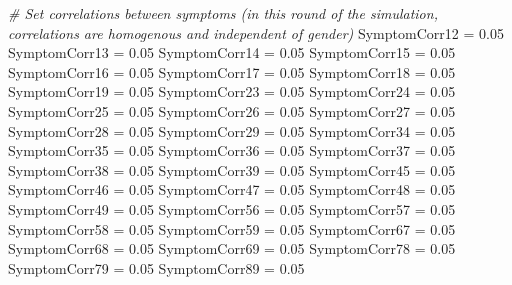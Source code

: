 \documentclass[]{article}
\newenvironment{Shaded}{\begin{snugshade}}{\end{snugshade}}
\newcommand{\FloatTok}[1]{\textcolor[rgb]{0.00,0.00,0.81}{#1}}
\newcommand{\StringTok}[1]{\textcolor[rgb]{0.31,0.60,0.02}{#1}}
\newcommand{\CommentTok}[1]{\textcolor[rgb]{0.56,0.35,0.01}{\textit{#1}}}
\newcommand{\NormalTok}[1]{#1}
\begin{document}
\begin{Shaded}
\begin{Highlighting}[]
{{{{{{{{{{\CommentTok{# Set correlations between symptoms (in this round of the simulation, correlations are homogenous and independent of gender)}
\NormalTok{SymptomCorr12 =}\StringTok{ }\FloatTok{0.05}
\NormalTok{SymptomCorr13 =}\StringTok{ }\FloatTok{0.05}
\NormalTok{SymptomCorr14 =}\StringTok{ }\FloatTok{0.05}
\NormalTok{SymptomCorr15 =}\StringTok{ }\FloatTok{0.05}
\NormalTok{SymptomCorr16 =}\StringTok{ }\FloatTok{0.05}
\NormalTok{SymptomCorr17 =}\StringTok{ }\FloatTok{0.05}
\NormalTok{SymptomCorr18 =}\StringTok{ }\FloatTok{0.05}
\NormalTok{SymptomCorr19 =}\StringTok{ }\FloatTok{0.05}
\NormalTok{SymptomCorr23 =}\StringTok{ }\FloatTok{0.05}
\NormalTok{SymptomCorr24 =}\StringTok{ }\FloatTok{0.05}
\NormalTok{SymptomCorr25 =}\StringTok{ }\FloatTok{0.05}
\NormalTok{SymptomCorr26 =}\StringTok{ }\FloatTok{0.05}
\NormalTok{SymptomCorr27 =}\StringTok{ }\FloatTok{0.05}
\NormalTok{SymptomCorr28 =}\StringTok{ }\FloatTok{0.05}
\NormalTok{SymptomCorr29 =}\StringTok{ }\FloatTok{0.05}
\NormalTok{SymptomCorr34 =}\StringTok{ }\FloatTok{0.05}
\NormalTok{SymptomCorr35 =}\StringTok{ }\FloatTok{0.05}
\NormalTok{SymptomCorr36 =}\StringTok{ }\FloatTok{0.05}
\NormalTok{SymptomCorr37 =}\StringTok{ }\FloatTok{0.05}
\NormalTok{SymptomCorr38 =}\StringTok{ }\FloatTok{0.05}
\NormalTok{SymptomCorr39 =}\StringTok{ }\FloatTok{0.05}
\NormalTok{SymptomCorr45 =}\StringTok{ }\FloatTok{0.05}
\NormalTok{SymptomCorr46 =}\StringTok{ }\FloatTok{0.05}
\NormalTok{SymptomCorr47 =}\StringTok{ }\FloatTok{0.05}
\NormalTok{SymptomCorr48 =}\StringTok{ }\FloatTok{0.05}
\NormalTok{SymptomCorr49 =}\StringTok{ }\FloatTok{0.05}
\NormalTok{SymptomCorr56 =}\StringTok{ }\FloatTok{0.05}
\NormalTok{SymptomCorr57 =}\StringTok{ }\FloatTok{0.05}
\NormalTok{SymptomCorr58 =}\StringTok{ }\FloatTok{0.05}
\NormalTok{SymptomCorr59 =}\StringTok{ }\FloatTok{0.05}
\NormalTok{SymptomCorr67 =}\StringTok{ }\FloatTok{0.05}
\NormalTok{SymptomCorr68 =}\StringTok{ }\FloatTok{0.05}
\NormalTok{SymptomCorr69 =}\StringTok{ }\FloatTok{0.05}
\NormalTok{SymptomCorr78 =}\StringTok{ }\FloatTok{0.05}
\NormalTok{SymptomCorr79 =}\StringTok{ }\FloatTok{0.05}
\NormalTok{SymptomCorr89 =}\StringTok{ }\FloatTok{0.05}

}}}}}}}}}}
\end{Highlighting}
\end{Shaded}
\end{document}
